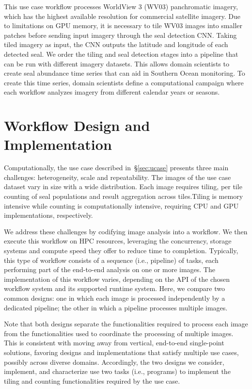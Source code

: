 This use case workflow processes WorldView 3 (WV03) panchromatic imagery,
which has the highest available resolution for commercial satellite imagery.
Due to limitations on GPU memory, it is necessary to tile WV03 images into
smaller patches before sending input imagery through the seal detection CNN.
Taking tiled imagery as input, the CNN outputs the latitude and longitude of
each detected seal. We order the tiling and seal detection stages into a
pipeline that can be run with different imagery datasets. This allows domain
scientists to create seal abundance time series that can aid in Southern Ocean
monitoring. To create this time series, domain scientists define a
computational campaign where each workflow analyzes imagery from different
calendar years or seasons.


\section{Workflow Design and Implementation}
\label{sec:design}

Computationally, the use case described in~\S\ref{sec:ucase} presents three
main challenges: heterogeneity, scale and repeatability. The images of the use
case dataset vary in size with a wide distribution. Each image requires
tiling, per tile counting of seal populations and result aggregation across
tiles.Tiling is memory intensive while counting is computationally intensive,
requiring CPU and GPU implementations, respectively.

We address these challenges by codifying image analysis into a workflow. We
then execute this workflow on HPC resources, leveraging the concurrency,
storage systems and compute speed they offer to reduce time to completion.
Typically, this type of workflow consists of a sequence (i.e., pipeline) of
tasks, each performing part of the end-to-end analysis on one or more images.
The implementation of this workflow varies, depending on the API of the chosen
workflow system and its supported runtime system. Here, we compare two common
designs: one in which each image is processed independently by a dedicated
pipeline; the other in which a pipeline processes multiple images.

Note that both designs separate the functionalities required to process each
image from the functionalities used to coordinate the processing of multiple
images. This is consistent with moving away from vertical, end-to-end
single-point solutions, favoring designs and implementations that satisfy
multiple use cases, possibly across diverse domains. Accordingly, the two
designs we consider, implement, and characterize use two tasks (i.e.,
programs) to implement the tiling and counting functionalities required by the
use case.

